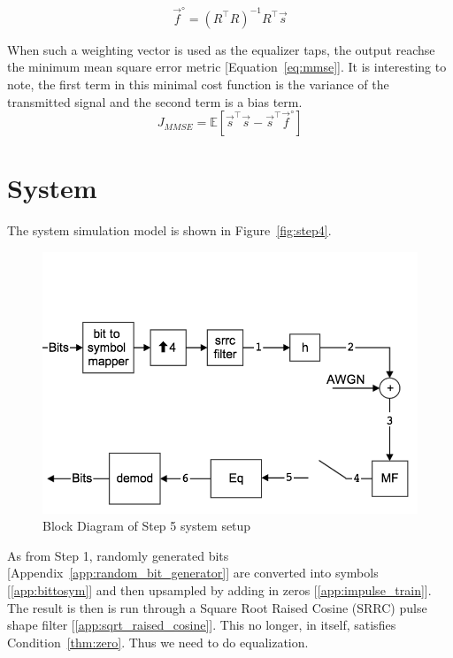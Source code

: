 \documentclass[]{article}
\begin{document}
\begin{equation}
\label{eq:optimal}
\vec{f}^{\circ} = \left(R^{\top}R\right)^{-1}R^{\top}\vec{s}
\end{equation}

When such a weighting vector is used as the equalizer taps, the output reachse the minimum mean square error metric  [Equation~\ref{eq:mmse}].  It is interesting to note, the first term in this minimal cost function is the variance of the transmitted signal and the second term is a bias term.
\begin{equation}
\label{eq:mmse}
J_{MMSE} = \mathbb{E} \left[ \vec{s}^{\top} \vec{s} - \vec{s}^{\top} \vec{f}^{\circ} \right]
\end{equation}
\newpage
\section{System}
\label{sec:system}
The system simulation model is shown in Figure~\ref{fig:step4}.  

\begin{figure}[H]
\centering
\includegraphics[width=\textwidth]{step5.png}
\caption{Block Diagram of Step 5 system setup\label{fig:step5}}
\end{figure}

As from Step 1, randomly generated bits [Appendix~\ref{app:random_bit_generator}] are converted into symbols [\ref{app:bittosym}] and then upsampled by adding in zeros [\ref{app:impulse_train}].  The result is then is run through a Square Root Raised Cosine (SRRC) pulse shape filter [\ref{app:sqrt_raised_cosine}].  This no longer, in itself, satisfies Condition~\ref{thm:zero}.  Thus we need to do equalization.
\end{document}
